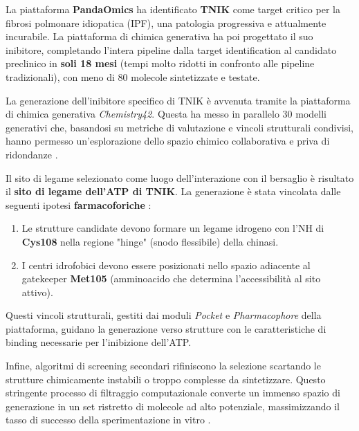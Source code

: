 La piattaforma \textbf{PandaOmics} ha 
identificato \textbf{TNIK} come target critico per la 
fibrosi polmonare idiopatica (IPF), una patologia 
progressiva e attualmente incurabile. La piattaforma 
di chimica generativa ha poi progettato il suo 
inibitore, completando l'intera pipeline dalla target 
identification al candidato preclinico in 
\textbf{soli 18 mesi} (tempi molto ridotti in confronto alle pipeline tradizionali), con meno di 80 molecole 
sintetizzate e testate.

La generazione dell'inibitore specifico di TNIK è avvenuta tramite la piattaforma di chimica generativa \textit{Chemistry42}. Questa ha messo in parallelo 30 modelli generativi che, basandosi su metriche di valutazione e vincoli strutturali condivisi, hanno permesso un'esplorazione dello spazio chimico collaborativa e priva di ridondanze \cite{renSmallmoleculeTNIKInhibitor2025}.

Il sito di legame selezionato come luogo dell'interazione con il bersaglio è risultato il
\textbf{sito di legame dell'ATP di TNIK}.
La generazione è stata vincolata dalle seguenti ipotesi 
\textbf{farmacoforiche} \cite{renSmallmoleculeTNIKInhibitor2025}: 
\begin{enumerate}
    \item Le strutture 
    candidate devono formare un legame idrogeno con 
    l'NH di \textbf{Cys108} nella regione "hinge" (snodo flessibile) della 
    chinasi.
    \item I centri idrofobici devono essere posizionati nello spazio adiacente al gatekeeper \textbf{Met105} (amminoacido che determina l'accessibilità al sito attivo).
\end{enumerate}
Questi vincoli strutturali, gestiti dai moduli 
\textit{Pocket} e \textit{Pharmacophore} della 
piattaforma, guidano la generazione verso strutture 
con le caratteristiche di binding necessarie 
per l'inibizione dell'ATP.

Infine, algoritmi di screening secondari rifiniscono la selezione scartando le strutture chimicamente instabili o troppo complesse da sintetizzare. Questo stringente processo di filtraggio computazionale converte un immenso spazio di generazione in un set ristretto di molecole ad alto potenziale, massimizzando il tasso di successo della sperimentazione in vitro \cite{renSmallmoleculeTNIKInhibitor2025}.